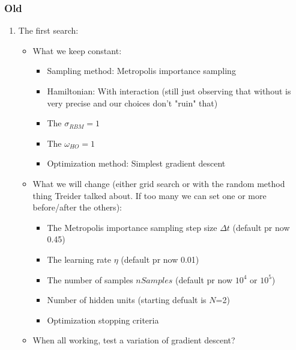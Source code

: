 \documentclass[twoside,english]{uiofysmaster}
\begin{document}
\subsubsection{Old}
\begin{enumerate}
	\item The first search:
	\begin{itemize}
		\item What we keep constant:
		\begin{itemize}
			\item Sampling method: Metropolis importance sampling
			\item Hamiltonian: With interaction (still just observing that without is very precise and our choices don't "ruin" that)
			\item The $\sigma_{RBM}=1$
			\item The $\omega_{HO}=1$
			\item Optimization method: Simplest gradient descent
		\end{itemize}
		\item What we will change (either grid search or with the random method thing Treider talked about. If too many we can set one or more before/after the others):
		\begin{itemize}
			\item The Metropolis importance sampling step size $\Delta t$ (default pr now 0.45)
			\item The learning rate $\eta$ (default pr now 0.01)
			\item The number of samples $nSamples$ (default pr now $10^4$ or $10^5$)
			\item Number of hidden units (starting defualt is $N$=2)
			\item Optimization stopping criteria
		\end{itemize}
		\item When all working, test a variation of gradient descent?
	\end{itemize}
\end{enumerate}
\end{document}
